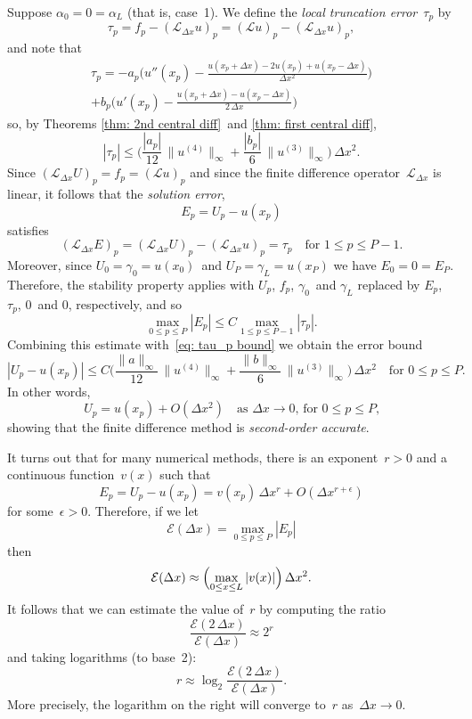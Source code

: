 Suppose $\alpha_0=0=\alpha_L$ (that is, case~1). We define the 
\emph{local truncation error}~$\tau_p$ by
\[
\tau_p=f_p-(\mathcal{L}_{\Delta x}u)_p
    =(\mathcal{L}u)_p-(\mathcal{L}_{\Delta x}u)_p,
\]
and note that
\begin{multline*}
\tau_p=-a_p\biggl(
    u''(x_p)-\frac{u(x_p+\Delta x)-2u(x_p)+u(x_p-\Delta x)}{\Delta x^2}\biggr)\\
+b_p\biggl(u'(x_p)-\frac{u(x_p+\Delta x)-u(x_p-\Delta x)}{2\,\Delta x}\biggr)
\end{multline*}
so, by Theorems \ref{thm: 2nd central diff}~and \ref{thm: first central diff},
\begin{equation}\label{eq: tau_p bound}
|\tau_p|\le\biggl(\frac{|a_p|}{12}\,\|u^{(4)}\|_\infty
    +\frac{|b_p|}{6}\,\|u^{(3)}\|_\infty\biggr)\,\Delta x^2.
\end{equation}
Since $(\mathcal{L}_{\Delta x}U)_p=f_p=(\mathcal{L}u)_p$ and since the 
finite difference operator~$\mathcal{L}_{\Delta x}$ is linear, it follows that
the \emph{solution error},
\[
E_p=U_p-u(x_p)
\]
satisfies
\[
(\mathcal{L}_{\Delta x}E)_p=(\mathcal{L}_{\Delta x}U)_p
    -(\mathcal{L}_{\Delta x}u)_p=\tau_p\quad\text{for $1\le p\le P-1$.}
\]
Moreover, since $U_0=\gamma_0=u(x_0)$~and $U_P=\gamma_L=u(x_P)$ we have 
$E_0=0=E_P$.  Therefore, the stability property applies with $U_p$, $f_p$, 
$\gamma_0$~and $\gamma_L$ replaced by $E_p$, $\tau_p$, $0$~and $0$, 
respectively, and so
\[
\max_{0\le p\le P}|E_p|\le C\max_{1\le p\le P-1}|\tau_p|.
\]
Combining this estimate with~\eqref{eq: tau_p bound} we obtain the error bound
\[
|U_p-u(x_p)|\le C \biggl(\frac{\|a\|_\infty}{12}\,\|u^{(4)}\|_\infty
    +\frac{\|b\|_\infty}{6}\,\|u^{(3)}\|_\infty\biggr)\,\Delta x^2
    \quad\text{for $0\le p\le P$.}
\]
In other words,
\[
U_p=u(x_p)+O(\Delta x^2)\quad\text{as $\Delta x\to0$, for $0\le p\le P$,}
\]
showing that the finite difference method is \emph{second-order accurate}.

It turns out that for many numerical methods, there is an exponent~$r>0$ and a 
continuous function~$v(x)$ such that
\begin{equation}\label{eq: Ep asymp}
E_p=U_p-u(x_p)=v(x_p)\,\Delta x^r+O(\Delta x^{r+\epsilon})
\end{equation}
for some~$\epsilon>0$.  Therefore, if we let
\[
\mathcal{E}(\Delta x)=\max_{0\le p\le P}|E_p|
\]
then
\[
\mathcal{E}(\Delta x)\approx\Bigl(\max_{0\le x\le L}|v(x)|\Bigr)\,\Delta x^2.
\]
It follows that we can estimate the value of~$r$ by computing the ratio
\[
\frac{\mathcal{E}(2\,\Delta x)}{\mathcal{E}(\Delta x)}\approx 2^r
\]
and taking logarithms (to base~2):
\[
r\approx\log_2\frac{\mathcal{E}(2\,\Delta x)}{\mathcal{E}(\Delta x)}.
\]
More precisely, the logarithm on the right will converge to~$r$ 
as~$\Delta x\to0$.

